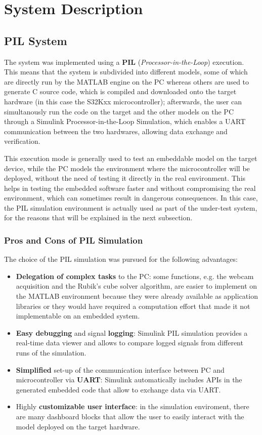 \documentclass{report}
\begin{document}
\chapter{System Description} 
\section{PIL System}    \label{sec:pil-sys}
The system was implemented using a \textbf{PIL} (\textit{Processor-in-the-Loop}) execution. This means that the system is subdivided into different models, some of which are directly run by the MATLAB engine on the PC whereas others are used to generate C source code, which is compiled and downloaded onto the target hardware (in this case the S32Kxx microcontroller); afterwards, the user can simultanously run the code on the target and the other models on the PC through a Simulink Processor-in-the-Loop Simulation, which enables a UART communication between the two hardwares, allowing data exchange and verification.

This execution mode is generally used to test an embeddable model on the target device, while the PC models the environment where the microcontroller will be deployed, without the need of testing it directly in the real environment. This helps in testing the embedded software faster and without compromising the real environment, which can sometimes result in dangerous consequences. In this case, the PIL simulation environment is actually used as part of the under-test system, for the reasons that will be explained in the next subsection.

\subsection{Pros and Cons of PIL Simulation}
The choice of the PIL simulation was pursued for the following advantages:
\begin{itemize}
    \item \textbf{Delegation of complex tasks} to the PC: some functions, e.g. the webcam acquisition and the Rubik's cube solver algorithm, are easier to implement on the MATLAB environment because they were already available as application libraries or they would have required a computation effort that made it not implementable on an embedded system.
    \item \textbf{Easy debugging} and signal \textbf{logging}: Simulink PIL simulation provides a real-time data viewer and allows to compare logged signals from different runs of the simulation.
    \item \textbf{Simplified} set-up of the communication interface between PC and microcontroller via \textbf{UART}: Simulink automatically includes APIs in the generated embedded code that allow to exchange data via UART.
    \item Highly \textbf{customizable user interface}: in the simulation enviroment, there are many dashboard blocks that allow the user to easily interact with the model deployed on the target hardware.
\end{itemize}
\end{document}
